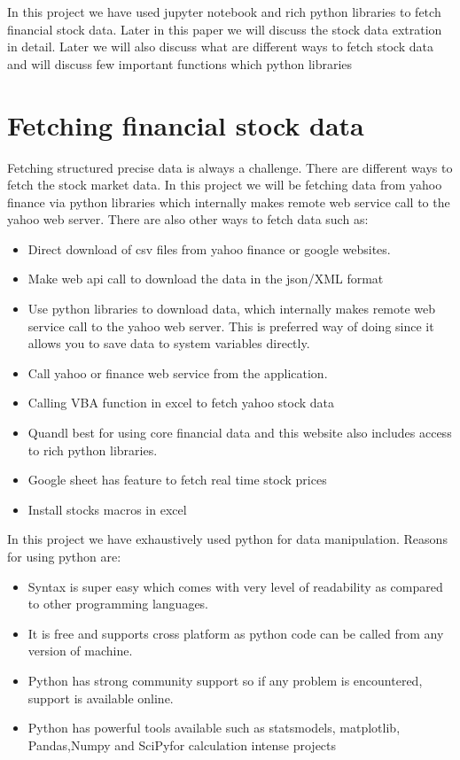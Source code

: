 \indent
In this project we have used jupyter notebook and rich python libraries to fetch financial stock data. Later in this paper we will discuss the stock data 
extration in detail. Later we will also discuss what are different ways to fetch stock data and will discuss few important functions which python libraries 
 
\section{Fetching financial stock data}

Fetching structured precise data is always a challenge. There are different ways to fetch the stock market data. In this project we will be fetching data from yahoo finance via python libraries which internally makes 
remote web service call to the yahoo web server. There are also other ways to fetch data such as:

\begin{itemize}
  \item Direct download of csv files from yahoo finance or google websites.
  \item Make web api call to download the data in the json/XML format
  \item Use python libraries to download data, which internally makes remote web service call to the yahoo web server. This is preferred way of doing since it allows you to save data to system variables directly. 
  \item Call yahoo or finance web service from the application. 
  \item Calling VBA function in excel to fetch yahoo stock data 
  \item Quandl best for using core financial data and this website also includes access to rich python libraries. 
  \item Google sheet has feature to fetch real time stock prices
  \item Install stocks macros in excel 
\end{itemize}

In this project we have exhaustively used python for data manipulation. Reasons for using python are:

\begin{itemize}
  \item Syntax is super easy which comes with very level of readability as compared to other programming languages.
  \item It is free and supports cross platform as python code can be called from any version of machine.
  \item Python has strong community support so if any problem is encountered, support is available online. 
  \item Python has powerful tools available such as statsmodels, matplotlib, Pandas,Numpy and SciPyfor calculation intense projects
\end{itemize}

